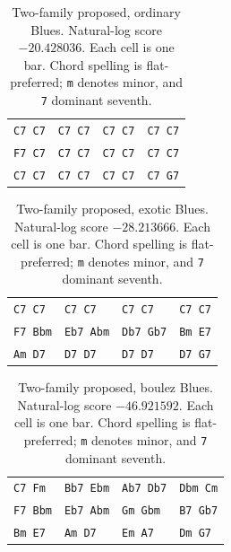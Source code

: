 \begin{table}[htbp]
\centering
\small
\begin{tabular}{llll}
\hline
\texttt{C7 C7} & \texttt{C7 C7} & \texttt{C7 C7} & \texttt{C7 C7} \\
\texttt{F7 C7} & \texttt{C7 C7} & \texttt{C7 C7} & \texttt{C7 C7} \\
\texttt{C7 C7} & \texttt{C7 C7} & \texttt{C7 C7} & \texttt{C7 G7} \\
\hline
\end{tabular}
\caption{Two-family proposed, ordinary Blues. Natural-log score $-20.428036$. Each cell is one bar. Chord spelling is flat-preferred; \texttt{m} denotes minor, and \texttt{7} dominant seventh.}
\end{table}
\begin{table}[htbp]
\centering
\small
\begin{tabular}{llll}
\hline
\texttt{C7 C7} & \texttt{C7 C7} & \texttt{C7 C7} & \texttt{C7 C7} \\
\texttt{F7 Bbm} & \texttt{Eb7 Abm} & \texttt{Db7 Gb7} & \texttt{Bm E7} \\
\texttt{Am D7} & \texttt{D7 D7} & \texttt{D7 D7} & \texttt{D7 G7} \\
\hline
\end{tabular}
\caption{Two-family proposed, exotic Blues. Natural-log score $-28.213666$. Each cell is one bar. Chord spelling is flat-preferred; \texttt{m} denotes minor, and \texttt{7} dominant seventh.}
\end{table}
\begin{table}[htbp]
\centering
\small
\begin{tabular}{llll}
\hline
\texttt{C7 Fm} & \texttt{Bb7 Ebm} & \texttt{Ab7 Db7} & \texttt{Dbm Cm} \\
\texttt{F7 Bbm} & \texttt{Eb7 Abm} & \texttt{Gm Gbm} & \texttt{B7 Gb7} \\
\texttt{Bm E7} & \texttt{Am D7} & \texttt{Em A7} & \texttt{Dm G7} \\
\hline
\end{tabular}
\caption{Two-family proposed, boulez Blues. Natural-log score $-46.921592$. Each cell is one bar. Chord spelling is flat-preferred; \texttt{m} denotes minor, and \texttt{7} dominant seventh.}
\end{table}
